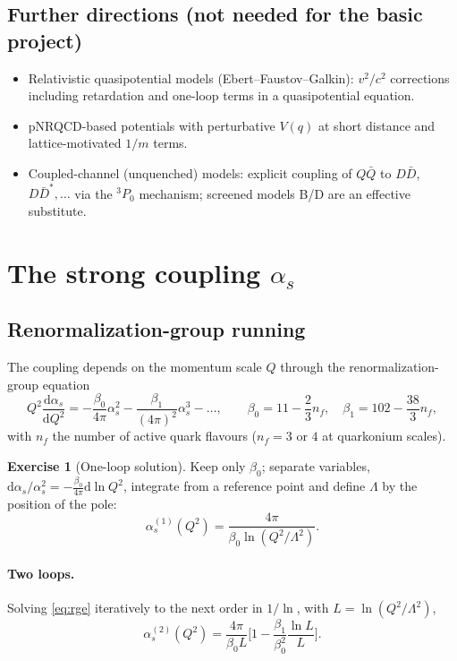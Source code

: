 \documentclass[11pt,a4paper]{article}
\numberwithin{equation}{section}
\theoremstyle{definition}
\newtheorem{exercise}[definition]{Exercise}
\theoremstyle{plain}
\theoremstyle{remark}
\numberwithin{algorithm}{section}
\newcommand{\as}{\alpha_s}
\newcommand{\dd}{\mathrm{d}}
\begin{document}
\subsection{Further directions (not needed for the basic project)}
\begin{itemize}[leftmargin=1.2em,itemsep=2pt]
\item Relativistic quasipotential models (Ebert--Faustov--Galkin): $v^2/c^2$ corrections including retardation and one-loop terms in a quasipotential equation.
\item pNRQCD-based potentials with perturbative $V(q)$ at short distance and lattice-motivated $1/m$ terms.
\item Coupled-channel (unquenched) models: explicit coupling of $Q\bar Q$ to $D\bar D$, $D\bar D^*,\dots$ via the ${}^3P_0$ mechanism; screened models B/D are an effective substitute.
\end{itemize}
\section{\texorpdfstring{The strong coupling $\as$}{The strong coupling alpha\_s}}\label{sec:alpha}

\subsection{Renormalization-group running}
The coupling depends on the momentum scale $Q$ through the renormalization-group equation
\begin{equation}
Q^2\frac{\dd\as}{\dd Q^2}=-\frac{\beta_0}{4\pi}\as^2-\frac{\beta_1}{(4\pi)^2}\as^3-\dots,\qquad
\beta_0=11-\frac23n_f,\quad \beta_1=102-\frac{38}{3}n_f,
\label{eq:rge}
\end{equation}
with $n_f$ the number of active quark flavours ($n_f=3$ or $4$ at quarkonium scales).

\begin{exercise}[One-loop solution]
Keep only $\beta_0$; separate variables, $\dd\as/\as^2=-\frac{\beta_0}{4\pi}\dd\ln Q^2$, integrate from a reference point and define $\Lambda$ by the position of the pole:
\begin{equation}
\as^{(1)}(Q^2)=\frac{4\pi}{\beta_0\ln(Q^2/\Lambda^2)} .
\end{equation}
\end{exercise}
\paragraph{Two loops.} Solving \eqref{eq:rge} iteratively to the next order in $1/\ln$, with $L=\ln(Q^2/\Lambda^2)$,
\begin{equation}
\as^{(2)}(Q^2)=\frac{4\pi}{\beta_0L}\Big[1-\frac{\beta_1}{\beta_0^2}\frac{\ln L}{L}\Big].
\end{equation}
\end{document}
